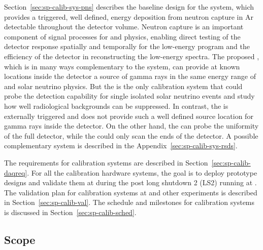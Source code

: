 Section~\ref{sec:sp-calib-sys-pns} describes the baseline design for the  system, which provides a triggered, well defined, energy deposition from neutron capture in Ar detectable throughout the detector volume. Neutron capture is an important component of signal processes for  and  physics, enabling direct testing of the detector response spatially and temporally for the low-energy program and the efficiency of the detector in reconstructing the low-energy spectra. The proposed , 
which is in many ways complementary to the 
system, can provide at known locations inside the detector a source of gamma rays in the same energy range of  and solar neutrino physics. But the  is the only calibration system that could probe the detection capability for single isolated solar neutrino events and study how well radiological backgrounds can be suppressed. In contrast, the  is externally triggered and does not provide such a well defined source location for gamma rays inside the detector. On the other hand, the  can probe the uniformity of the full detector, while the  could only scan the ends of the detector. A possible  complementary  system is described in the Appendix~\ref{sec:sp-calib-sys-rsds}. 

The  requirements for calibration systems are described in Section~\ref{sec:sp-calib-daqreq}. For all the calibration hardware systems, the goal is to deploy prototype designs and validate them at  during the post long shutdown 2 (LS2) running  at . The validation plan for calibration systems at  and other experiments is described in Section~\ref{sec:sp-calib-val}. 
The schedule and milestones for calibration systems is discussed in Section~\ref{sec:sp-calib-sched}.


\subsection{Scope}
\label{sec:sp-calib-ov-scope}

